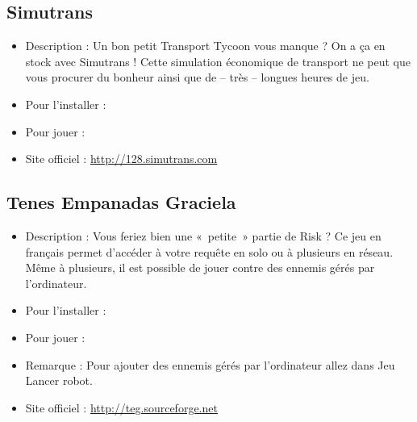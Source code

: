 \subsection{Simutrans}
\begin{itemize}
\begingroup
{}
\item Description : Un bon petit Transport Tycoon vous manque ? On a ça en stock avec Simutrans ! Cette simulation économique de transport ne peut que vous procurer du bonheur ainsi que de -- très -- longues heures de jeu.{\par}
\endgroup
\item Pour l'installer : 
\item Pour jouer : 
\item Site officiel : \url{http://128.simutrans.com}{\par}
\end{itemize}
\subsection{Tenes Empanadas Graciela}
\begin{itemize}
\begingroup
{}
\item Description : Vous feriez bien une «~petite~» partie de Risk ? Ce jeu en français permet d'accéder à votre requête en solo ou à plusieurs en réseau. Même à plusieurs, il est possible de jouer contre des ennemis gérés par l'ordinateur.{\par}
\endgroup
\item Pour l'installer : 
\item Pour jouer : 
\item Remarque : Pour ajouter des ennemis gérés par l'ordinateur allez dans Jeu \FlecheDroite Lancer robot.{\par}
\item Site officiel : \url{http://teg.sourceforge.net}{\par}
\end{itemize}
